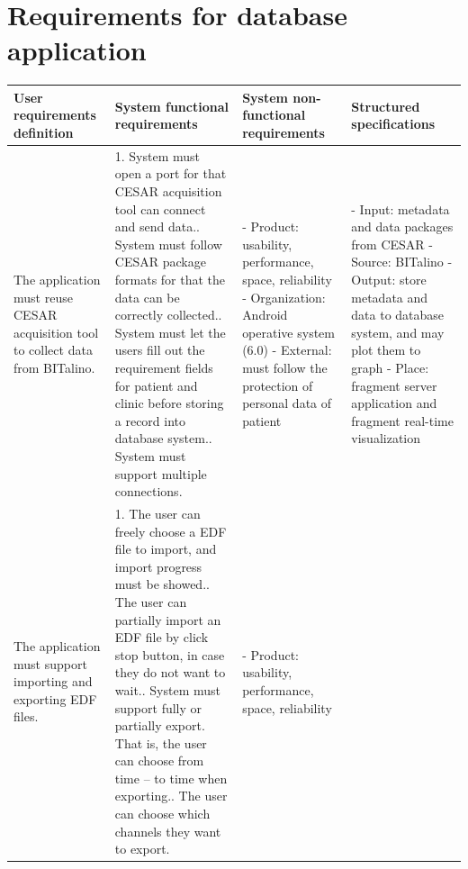 \section{Requirements for database application}
\begin{table}
\begin{adjustwidth}{-1.5cm}{}
\begin{center}
\begin{tabular}{ |p{2.4cm}|p{5.5cm}|p{3.3cm}|p{4.3cm}|}
 \hline
 User requirements definition& System functional requirements& System non-functional requirements& Structured specifications\\
 \hline
 The application must reuse CESAR acquisition tool to collect data from BITalino.&
 1. System must open a port for that CESAR acquisition tool can connect and send data.\newline
 2. System must follow CESAR package formats for that the data can be correctly collected.\newline
 3. System must let the users fill out the requirement fields for patient and clinic before storing a record into database system.\newline
 4. System must support multiple connections.&
 - Product: usability, performance, space, reliability\newline
 - Organization: Android operative system (6.0)\newline
 - External: must follow the protection of personal data of patient&
 - Input: metadata and data packages from CESAR\newline
 - Source: BITalino\newline
 - Output: store metadata and data to database system, and may plot them to graph\newline
 - Place: fragment server application and fragment real-time visualization\\
 \hline
 The application must support importing and exporting EDF files.&
 1. The user can freely choose a EDF file to import, and import progress must be showed.\newline
 2. The user can partially import an EDF file by click stop button, in case they do not want to wait.\newline
 3. System must support fully or partially export. That is, the user can choose from time – to time when exporting.\newline
 4. The user can choose which channels they want to export.&
 - Product: usability, performance, space, reliability\newline

\end{tabular}
\end{center}
\end{adjustwidth}
\end{table}
